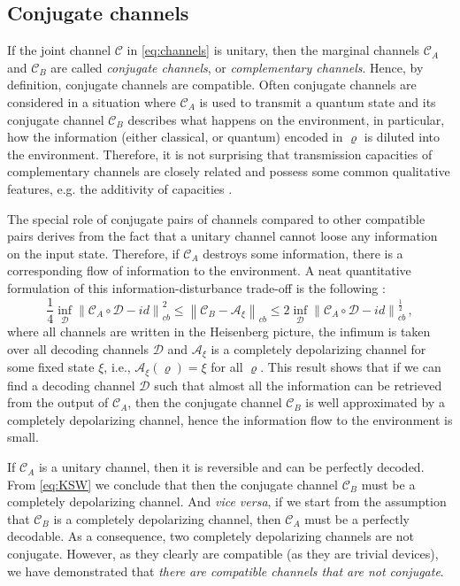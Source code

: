 \documentclass[12pt]{article}
\theoremstyle{definition}
\newcommand{\no}[1]{\left\|#1\right\|} %
\newcommand{\Cc}{\mathcal{C}} %
\begin{document}
{%
\subsection{Conjugate channels}\label{sec:complementarity}

If the joint channel $\Cc$ in \eqref{eq:channels} is unitary, then the marginal channels $\Cc_A$ and $\Cc_B$ are called \emph{conjugate channels}, or \emph{complementary channels}. Hence, by definition, conjugate channels are compatible. Often conjugate channels are considered in a situation where $\Cc_A$ is used to transmit a quantum state and its conjugate channel $\Cc_B$ describes what happens on the environment, in particular, how the information (either classical, or quantum) encoded in $\varrho$ is diluted into the environment. 
Therefore, it is not surprising that transmission capacities of complementary channels are closely related \cite{KiMaNaRu07} and possess some common qualitative features, e.g. the additivity of capacities \cite{Holevo05}.

The special role of conjugate pairs of channels compared to other compatible pairs derives from the fact that a unitary channel cannot loose any information on the input state. Therefore, if $\Cc_A$ destroys some information, there is a corresponding flow of information to the environment. 
A neat quantitative formulation of this information-disturbance trade-off is the following \cite{KrScWe08ieee}:
\begin{equation}\label{eq:KSW}
\frac{1}{4} \inf_\mathcal{D} \no{ \Cc_A \circ \mathcal{D} - id }_{cb}^2 \leq   \no{ \Cc_B  - \mathcal{A}_\xi }_{cb} \leq 2 \inf_\mathcal{D} \no{ \Cc_A \circ \mathcal{D} - id }_{cb}^{\frac{1}{2}} \, ,  
\end{equation}
where all channels are written in the Heisenberg picture, the infimum is taken over all decoding channels $\mathcal{D}$ and $\mathcal{A}_\xi$ is a completely depolarizing channel for some fixed state $\xi$, i.e., $\mathcal{A}_\xi(\varrho)=\xi$ for all $\varrho$.
This result shows that if we can find a decoding channel $\mathcal{D}$ such that almost all the information can be retrieved from the output of $\Cc_A$, then the conjugate channel $\Cc_B$ is well approximated
by a completely depolarizing channel, hence the information flow to the environment is small.

If $\Cc_A$ is a unitary channel, then it is reversible and can be perfectly decoded. 
From \eqref{eq:KSW} we conclude that then the conjugate channel $\Cc_B$ must be a completely depolarizing channel. And \emph{vice versa}, if we start from the assumption that $\Cc_B$ is a completely depolarizing channel, then $\Cc_A$ must be a perfectly decodable.
As a consequence, two completely depolarizing channels are not conjugate.
However, as they clearly are compatible (as they are trivial devices), we have demonstrated that \emph{there are compatible channels that are not conjugate}.

}
\end{document}
